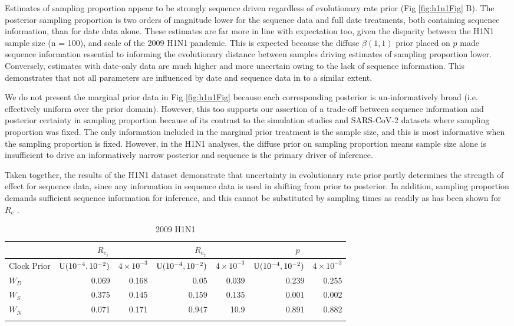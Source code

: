\documentclass{article}
\begin{document}
Estimates of sampling proportion appear to be strongly sequence driven regardless of evolutionary rate prior (Fig \ref{fig:h1n1Fig} B). The posterior sampling proportion is two orders of magnitude lower for the sequence data and full date treatments, both containing sequence information, than for date data alone. These estimates are far more in line with expectation too, given the disparity between the H1N1 sample size (n = 100), and scale of the 2009 H1N1 pandemic. This is expected because the diffuse $\beta(1, 1)$ prior placed on $p$ made sequence information essential to informing the evolutionary distance between samples driving estimates of sampling proportion lower. Conversely, estimates with date-only data are much higher and more uncertain owing to the lack of sequence information. This demonstrates that not all parameters are influenced by date and sequence data in to a similar extent.

We do not present the marginal prior data in Fig \ref{fig:h1n1Fig} because each corresponding posterior is un-informatively broad (i.e. effectively uniform over the prior domain). However, this too supports our assertion of a trade-off between sequence information and posterior certainty in sampling proportion because of its contrast to the simulation studies and SARS-CoV-2 datasets where sampling proportion was fixed. The only information included in the marginal prior treatment is the sample size, and this is most informative when the sampling proportion is fixed. However, in the H1N1 analyses, the diffuse prior on sampling proportion means sample size alone is insufficient to drive an informatively narrow posterior and sequence is the primary driver of inference.

Taken together, the results of the H1N1 dataset demonstrate that uncertainty in evolutionary rate prior partly determines the strength of effect for sequence data, since any information in sequence data is used in shifting from prior to posterior. In addition, sampling proportion demands sufficient sequence information for inference, and this cannot be substituted by sampling times as readily as has been shown for $R_e$ \cite{Featherstone2021Infectious,volz_sampling_2014}.

\begin{table}[H]
\centering
\caption{2009 H1N1}
\begin{tabular}{lrrrrrr}
\midrule
& \multicolumn{2}{c}{\textbf{$R_{e_1}$}} & \multicolumn{2}{|c|}{\textbf{$R_{e_2}$}} &
\multicolumn{2}{c}{\textbf{$p$}}\\
\midrule
Clock Prior  & $\textnormal{U}(10^{-4}, 10^{-2})$ & $4\times10^{-3}$ & $\textnormal{U}(10^{-4}, 10^{-2})$ & $4\times10^{-3}$ & $\textnormal{U}(10^{-4}, 10^{-2})$ & $4\times10^{-3}$ \\
\midrule
$W_{D}$   &   0.069   &  0.168   &   0.05    &  0.039  & 0.239 & 0.255 \\
$W_{S}$   &   0.375   &  0.145   &   0.159   &  0.135  & 0.001 & 0.002\\ 
$W_{N}$   &   0.071   &  0.171   &    0.947  &  10.9   & 0.891 & 0.882\\
\bottomrule 
\label{tab:h1n1Tab}
\end{tabular}
\end{table}
\end{document}
